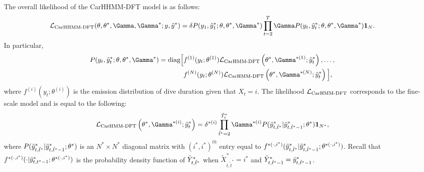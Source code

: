 The overall likelihood of the CarHHMM-DFT model is as follows:
%
$$\calL_{\text{CarHHMM-DFT}}(\theta,\theta^*,\Gamma,\Gamma^*;y,\z) = \delta P(y_1,\z_1;\theta,\theta^*,\Gamma^*) \prod_{t=2}^T \Gamma P(y_t,\z_t;\theta,\theta^*,\Gamma^*) \mathbf{1}_N.$$
%
In particular,
%
\begin{align*}
P(y_t,\z_t;\theta,\theta^*,\Gamma^*)  = \text{diag}\Big[&f^{(1)}(y_t;\theta^{(1)})\calL_{\text{CarHMM-DFT}}\left(\theta^*,\Gamma^{*(1)};\z_t\right), \ldots , \\
&f^{(N)}(y_t;\theta^{(N)})\calL_{\text{CarHMM-DFT}}\left(\theta^*,\Gamma^{*(N)};\z_t\right) \Big],
\end{align*}
%
where $f^{(i)}(y_t;\theta^{(i)})$ is the emission distribution of dive duration given that $X_t = i$. The likelihood $\mathcal{L}_{\text{CarHMM-DFT}}$ corresponds to the fine-scale model and is equal to the following:
%
$$\calL_{\text{CarHMM-DFT}}\left(\theta^{*},\Gamma^{*(i)};\z_t\right) = \delta^{*(i)} \prod_{\tilde t^* = 2}^{\tilde T^*_t} \Gamma^{*(i)} P(\z_{t,\tilde t^*}|\z_{t,\tilde t^*-1};\theta^*) \mathbf{1}_{N^*},$$
%
where $P(\tilde{y}^*_{t,\tilde t^*}|\tilde{y}^*_{t,\tilde t^*-1};\theta^*)$ is an $N^* \times N^*$ diagonal matrix with $(i^*,i^*)^{th}$ entry equal to $f^{*(\cdot,i^*)}(\tilde{y}^*_{t,\tilde t^*}|\tilde{y}^*_{t,\tilde t^*-1}; \theta^{*(\cdot,i^*)})$.
%
Recall that $f^{*(\cdot,i^*)}(\cdot|\tilde{y}^*_{t,t^*-1}; \theta^{*(\cdot,i^*)})$ is the probability density function of $\tilde{Y}^*_{t,\tilde t^*}$ when $\tilde X^*_{t,\tilde t^*} = i^*$ and $\tilde{Y}^*_{t,\tilde t^*-1} = \tilde{y}^*_{t,\tilde t^*-1}$.


